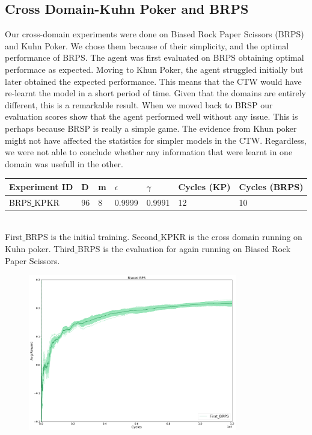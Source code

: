 \documentclass{article}
\theoremstyle{definition}
\newtheorem{primary statistics}[definition]{Primary Statistics}
\newtheorem{auxiliary statistics}[definition]{Auxiliary Statistics}
\begin{document}
\subsection{Cross Domain-Kuhn Poker and BRPS }
Our cross-domain experiments were done on Biased Rock Paper Scissors (BRPS) and Kuhn Poker. We chose them because of their simplicity, and the optimal performance of BRPS. The agent was first evaluated on BRPS obtaining optimal performace as expected. Moving to Khun Poker, the agent struggled initially but later obtained the expected performance. This means that the CTW would have re-learnt the model in a short period of time. Given that the domains are entirely different, this is a remarkable result. When we moved back to BRSP our evaluation scores show that the agent performed well without any issue. This is perhaps because BRSP is really a simple game. The evidence from Khun poker might not have affected the statistics for simpler models in the CTW. Regardless, we were not able to conclude whether any information that were learnt in one domain was usefull in the other.

 \begin{tabular}{|l|l|l|l|l|l|l|}
 \hline \centering
 Experiment ID& D & m & $\epsilon$ & $\gamma$ & Cycles (KP) & Cycles (BRPS) \\ \hline
BRPS\underline{ }KPKR  & 96       & 8           & 0.9999       & 0.9991             & 12    &  10      \\ \hline    
\end{tabular} \\

First\underline{ }BRPS is the initial training. Second\underline{ }KPKR is the cross domain running on Kuhn poker. Third\underline{ }BRPS is the evaluation for again running on Biased Rock Paper Scissors.


 \begin{figure}[h]
 \centering
    \includegraphics[width=9.1cm]{First_BRPS}
\end{figure}
\end{document}
